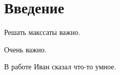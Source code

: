 
\section*{Введение}
\label{sec:intro}

Решать макссаты важно.

\newpage

Очень важно.

\lipsum[1]

\newpage

В работе \cite{bliznets12} Иван сказал что-то умное.
